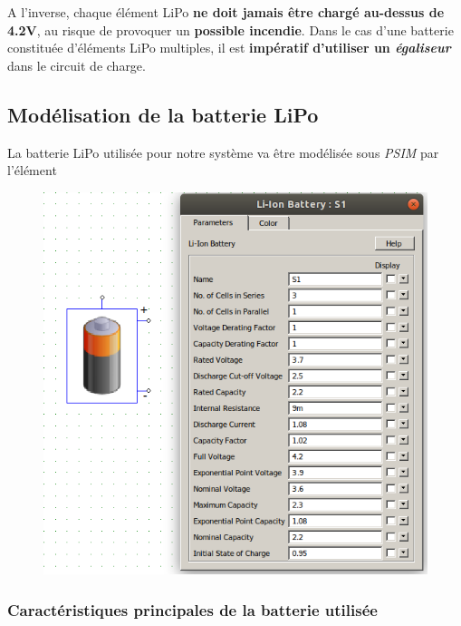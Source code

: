 		A l'inverse, chaque élément LiPo \textbf{ne doit jamais être chargé au-dessus de 4.2V}, au risque de provoquer un \textbf{possible incendie}. Dans le cas d'une batterie constituée d'éléments LiPo multiples, il est \textbf{impératif d'utiliser un \textit{égaliseur}} dans le circuit de charge.
		
			
			\subsection{Modélisation de la batterie LiPo}
			
			La batterie LiPo utilisée pour notre système va être modélisée sous \textit{PSIM} par l'élément 
			
			\begin{figure}[h]
				\begin{center}
					\includegraphics[scale=0.5]{../Illus/lipo_model_psim.png}
				\end{center}
			\end{figure}
			
				\subsubsection{Caractéristiques principales de la batterie utilisée}
			
